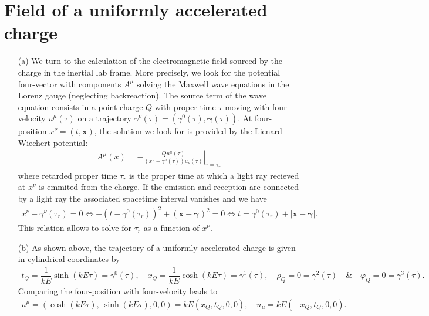 \documentclass[10pt, a4paper]{article}
\begin{document}
\begin{enumerate}
\end{enumerate}

\section{Field of a uniformly accelerated charge}
\begin{enumerate}
  \item[(a)] We turn to the calculation of the electromagnetic field sourced by the charge in the inertial lab frame. More precisely, we look for the potential four-vector with components $A^{\mu}$ solving the Maxwell wave equations in the Lorenz gauge (neglecting backreaction). The source term of the wave equation consists in a point charge $Q$ with proper time $\tau$ moving with four-velocity $u^{\mu}(\tau)$ on a trajectory $\gamma^{\nu}(\tau) = (\gamma^0(\tau), \boldsymbol{\gamma}(\tau))$. At four-position $x^\nu = (t, \mathbf{x})$, the solution we look for is provided by the Lienard-Wiechert potential:
  \begin{align*}
    A^\mu(x)=-\left.\frac{Q u^\mu(\tau)}{\left(x^\nu-\gamma^\nu(\tau)\right) u_\nu(\tau)}\right|_{\tau=\tau_r}
 \end{align*}
 where retarded proper time $\tau_r$ is the proper time at which a light ray recieved at $x^{\nu}$ is emmited from the charge. If the emission and reception are connected by a light ray the associated spacetime interval vanishes and we have 
 \begin{align*}
  x^{\nu} - \gamma^\nu(\tau_r) = 0 \iff -(t-\gamma^0(\tau_r))^2+(\mathbf{x}-\boldsymbol{\gamma})^2 = 0 \iff t = \gamma^0(\tau_r) + |\mathbf{x}-\boldsymbol{\gamma}|.
 \end{align*}
 This relation allows to solve for $\tau_r$ as a function of $x^{\nu}$. 
  \item[(b)] As shown above, the trajectory of a uniformly accelerated charge is given in cylindrical coordinates by
  \begin{align*}
    t_Q = \dfrac{1}{kE}\sinh(kE \tau) = \gamma^0(\tau), \quad x_Q = \dfrac{1}{kE}\cosh(kE \tau) = \gamma^1(\tau),\quad \rho_Q = 0 = \gamma^2(\tau)\quad \& \quad \varphi_Q = 0 = \gamma^3(\tau). 
  \end{align*}
  Comparing the four-position with four-velocity leads to 
  \begin{align*}
    u^\mu = (\cosh(kE \tau),\ \sinh(kE \tau), 0, 0) = kE (x_Q, t_Q, 0, 0), \quad u_\mu = kE (-x_Q, t_Q, 0, 0).
  \end{align*}

\end{enumerate}
\end{document}
